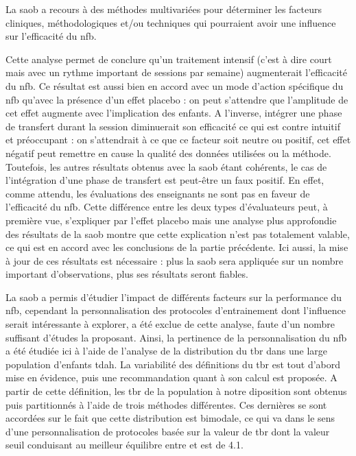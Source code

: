 La \gls{saob} a recours à des méthodes multivariées pour déterminer les facteurs cliniques, méthodologiques et/ou techniques qui pourraient avoir une 
influence sur l'efficacité du \gls{nfb}. 

Cette analyse permet de conclure qu'un traitement intensif (c'est à dire court mais avec un rythme important de sessions par semaine) augmenterait 
l'efficacité du \gls{nfb}. Ce résultat est aussi bien en accord avec un mode d'action spécifique du \gls{nfb} qu'avec la présence d'un effet placebo :
on peut s'attendre que l'amplitude de cet effet augmente avec l'implication des enfants. A l'inverse,  
intégrer une phase de transfert durant la session diminuerait son efficacité ce qui est contre intuitif et préoccupant : on s'attendrait à ce que ce facteur 
soit neutre ou positif, cet effet négatif peut remettre en cause la qualité des données utilisées ou la méthode. Toutefois, les autres résultats obtenus 
avec la \gls{saob} étant cohérents, le cas de l'intégration d'une phase de transfert est peut-être un faux positif. En effet, comme attendu, les évaluations des enseignants ne sont pas en faveur de l'efficacité du \gls{nfb}. 
Cette différence entre les deux types d'évaluateurs peut, à première vue, s'expliquer par l'effet placebo mais une analyse plus approfondie des 
résultats de la \gls{saob} montre que cette explication n'est pas totalement valable, ce qui est en accord avec les conclusions de la partie précédente. 
Ici aussi, la mise à jour de ces résultats est nécessaire : plus la \gls{saob} sera appliquée sur un nombre important d'observations,
plus ses résultats seront fiables.

La \gls{saob} a permis d'étudier l'impact de différents facteurs sur la performance du \gls{nfb}, cependant la personnalisation 
des protocoles d'entrainement dont l'influence serait intéressante 
à explorer, a été exclue de cette analyse, faute d'un nombre suffisant d'études la proposant. Ainsi, la pertinence de la personnalisation 
du \gls{nfb} a été étudiée ici à l'aide de l'analyse de la distribution 
du \gls{tbr} dans une large population d'enfants \gls{tdah}. La variabilité des définitions du \gls{tbr} est tout d'abord mise en 
évidence, puis une recommandation quant à son calcul est proposée. A partir de cette définition, les \gls{tbr} de la population à notre diposition
sont obtenus puis partitionnés à l'aide de trois méthodes différentes. Ces dernières se sont accordées sur le fait que cette distribution 
est bimodale, ce qui va dans 
le sens d'une personnalisation de protocoles basée sur la valeur de \gls{tbr} dont la valeur seuil conduisant au meilleur équilibre entre 
 et  est de 4.1. 

